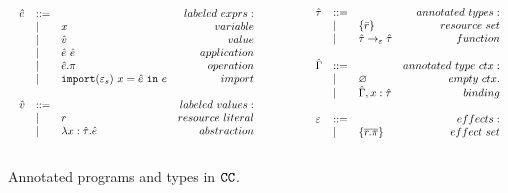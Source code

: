 \begin{figure}
\vspace{-0.6cm}
\[
\begin{array}{lll}

\begin{array}{lllr}

\hat e & ::= & ~ & labeled~exprs: \\
	& | & x & variable \\
	& | & \hat v & value \\
	& | & \hat e ~ \hat e & application \\
	& | & \hat e.\pi & operation \\
	& | & \mathtt{import}(\varepsilon_s)~x = \hat e~\mathtt{in}~e & import \\
	&&\\

\hat v & ::= & ~ & labeled~values: \\
	& | & r & resource~literal\\
	& | & \lambda x: \hat \tau.\hat e & abstraction \\
	&&\\

\end{array}

& ~~~~~~~~&

\begin{array}{lllr}

\hat \tau & ::= & ~ & annotated ~types: \\
		& | & \{ \bar r \} & resource~set\\
		& | & \hat \tau \rightarrow_{\varepsilon} \hat \tau & function \\
		&&\\

\hat \Gamma & ::= & ~ & annotated~type~ctx:\\
				& | & \varnothing & empty~ctx.\\
				& | & \hat \Gamma, x: \hat \tau & binding \\
				&&\\

\varepsilon & ::= & ~ & effects: \\
		& | & \{ \overline{r.\pi} \} & effect~set \\
		&&\\

\end{array}

\end{array}
\]
\vspace{-0.6cm}
\caption{Annotated programs and types in $\mathtt{CC}$.}
\vspace{-0.6cm}
\label{fig:epscalc_annotated_grammar}
\end{figure}

